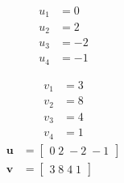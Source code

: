 \[\begin{aligned}
u_{1} &= 0 \\
u_{2} &= 2 \\
u_{3} &= -2 \\
u_{4} &= -1 
\end{aligned}\]

\[\begin{aligned}
v_{1} &= 3 \\
v_{2} &= 8 \\
v_{3} &= 4 \\
v_{4} &= 1 
\end{aligned}\]
\[\begin{aligned}
\mathbf{u} &= \begin{bmatrix}0\;2\;-2\;-1\end{bmatrix} \\
\mathbf{v} &= \begin{bmatrix}3\;8\;4\;1\end{bmatrix}
\end{aligned}\]

